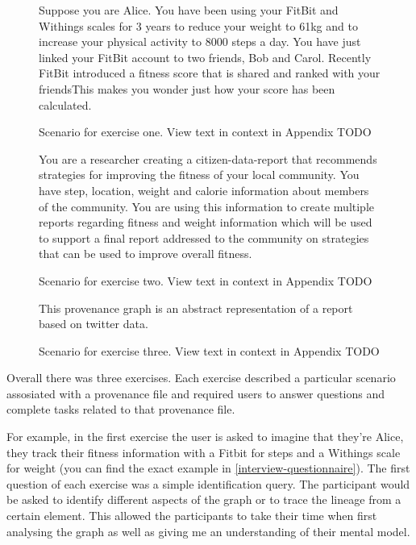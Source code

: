 \begin{figure}[b]
\caption{Scenario for exercise one. View text in context in Appendix TODO}
\begin{framed}
\begin{flushleft}
Suppose you are Alice. You have been using your FitBit and Withings scales for 3 years to reduce your weight to 61kg and to increase your physical activity to 8000 steps a day. You have just linked your FitBit account to two friends, Bob and Carol. Recently FitBit introduced a fitness score that is shared and ranked with your friends\textellipsis This makes you wonder just how your score has been calculated.
\end{flushleft}
\end{framed}
\end{figure}
\begin{figure}[b]
\caption{Scenario for exercise two. View text in context in Appendix TODO}
\begin{framed}
\begin{flushleft}
You are a researcher creating a citizen-data-report that recommends strategies for improving the fitness of your local community. You have step, location, weight and calorie information about members of the community. You are using this information to create multiple reports regarding fitness and weight information which will be used to support a final report addressed to the community on strategies that can be used to improve overall fitness. 
\end{flushleft}
\end{framed}
\end{figure}
\begin{figure}[b]
\caption{Scenario for exercise three. View text in context in Appendix TODO}
\begin{framed}
\begin{flushleft}
This provenance graph is an abstract representation of a report based on twitter data. 
\end{flushleft}
\end{framed}
\end{figure}

Overall there was three exercises. Each exercise described a particular scenario assosiated with a provenance file and required users to answer questions and complete tasks related to that provenance file. 

For example, in the first exercise the user is asked to imagine that they're Alice, they track their fitness information with a Fitbit for steps and a Withings scale for weight (you can find the exact example in \ref{interview-questionnaire}). The first question of each exercise was a simple identification query. The participant would be asked to identify different aspects of the graph or to trace the lineage from a certain element. This allowed the participants to take their time when first analysing the graph as well as giving me an understanding of their mental model.

